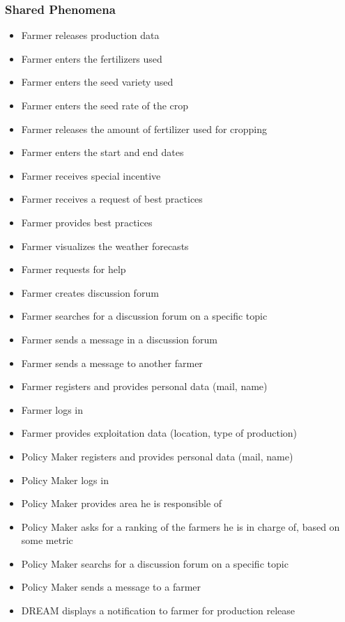 \subsubsection{Shared Phenomena}
\begin{itemize}
	
	\item
	Farmer releases production data
	\item
	Farmer enters the fertilizers used
	\item
	Farmer enters the seed variety used
	\item
	Farmer enters the seed rate of the crop
	\item
	Farmer releases the amount of fertilizer used for cropping
	\item
	Farmer enters the start and end dates
	\item
	Farmer receives special incentive
	\item
	Farmer receives a request of best practices
	\item
	Farmer provides best practices
	\item
	Farmer visualizes the weather forecasts
	\item
	Farmer requests for help
	\item
	Farmer creates discussion forum
	\item
	Farmer searches for a discussion forum on a specific topic
	\item
	Farmer sends a message in a discussion forum
	\item
	Farmer sends a message to another farmer
	\item
	Farmer registers and provides personal data (mail, name)
	\item
	Farmer logs in
	\item
	Farmer provides exploitation data (location, type of production)
	\item
	Policy Maker registers and provides personal data (mail, name)
	\item
	Policy Maker logs in
	\item
	Policy Maker provides area he is responsible of
	\item
	Policy Maker asks for a ranking of the farmers he is in charge of, based on some metric
	\item
	Policy Maker searchs for a discussion forum on a specific topic
	\item
	Policy Maker sends a message to a farmer
	\item
	DREAM displays a notification to farmer for production release

\end{itemize}
